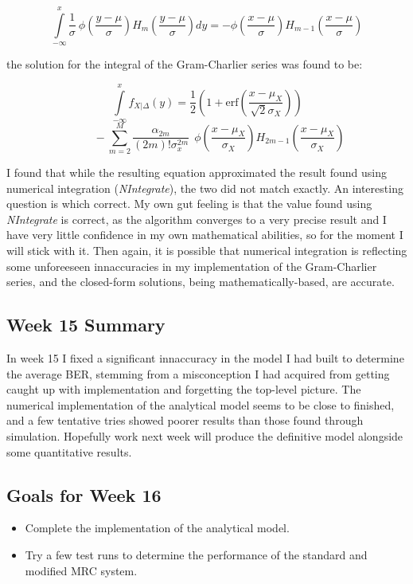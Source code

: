 \[
\int \limits_{-\infty}^x \frac{1}{\sigma} \: \phi \! \left ( \frac{y-\mu}{\sigma} \right ) H_m \! \left ( \frac{y-\mu}{\sigma} \right ) dy =
- \phi \! \left ( \frac{x-\mu}{\sigma} \right ) H_{m-1} \! \left ( \frac{x-\mu}{\sigma} \right )
\]

the solution for the integral of the Gram-Charlier series was found to
be:

\[
\int \limits_{- \infty}^x f_{X\vert \Delta}(y) = \frac{1}{2} \left ( 1 + \text{erf} \! \left ( \frac{x-\mu_X}{\sqrt{2} \sigma_X} \right ) \right )
\]
\[
\; \; \; \; \; \; \; \;  - \sum \limits_{m=2}^M \frac{\alpha_{2m}}{(2m)! \sigma_x^{2m}} \: \: \phi \! \left ( \frac{x-\mu_X}{\sigma_X} \right ) H_{2m-1} \! \left ( \frac{x-\mu_X}{\sigma_X} \right )
\]

I found that while the resulting equation approximated the result found
using numerical integration (\emph{NIntegrate}), the two did not match
exactly. An interesting question is which correct. My own gut feeling is
that the value found using \emph{NIntegrate} is correct, as the
algorithm converges to a very precise result and I have very little
confidence in my own mathematical abilities, so for the moment I will
stick with it. Then again, it is possible that numerical integration is
reflecting some unforeeseen innaccuracies in my implementation of the
Gram-Charlier series, and the closed-form solutions, being
mathematically-based, are accurate.

\subsection{Week 15 Summary}

In week 15 I fixed a significant innaccuracy in the model I had built to
determine the average BER, stemming from a misconception I had acquired
from getting caught up with implementation and forgetting the top-level
picture. The numerical implementation of the analytical model seems to
be close to finished, and a few tentative tries showed poorer results
than those found through simulation. Hopefully work next week will
produce the definitive model alongside some quantitative results.

\subsection{Goals for Week 16}

\begin{itemize}
\itemsep1pt\parskip0pt
\item
  Complete the implementation of the analytical model.
\item
  Try a few test runs to determine the performance of the standard and
  modified MRC system.
\end{itemize}

